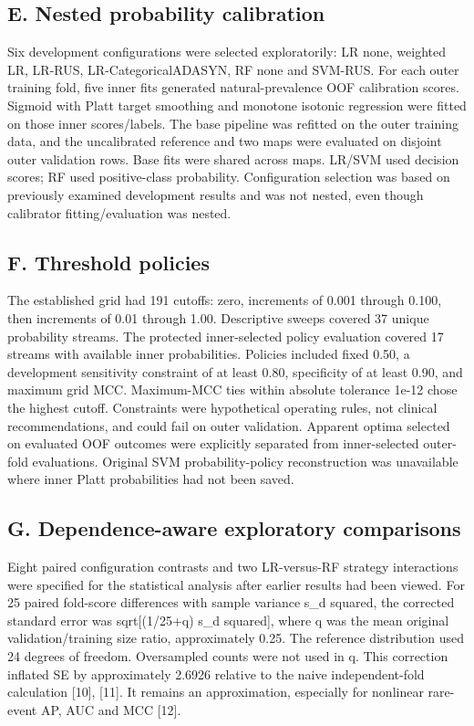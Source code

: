 \documentclass[10pt,twocolumn,letterpaper]{article}
\begin{document}
\subsection*{E. Nested probability calibration}
Six development configurations were selected exploratorily: LR none, weighted LR, LR-RUS, LR-CategoricalADASYN, RF none and SVM-RUS. For each outer training fold, five inner fits generated natural-prevalence OOF calibration scores. Sigmoid with Platt target smoothing and monotone isotonic regression were fitted on those inner scores/labels. The base pipeline was refitted on the outer training data, and the uncalibrated reference and two maps were evaluated on disjoint outer validation rows. Base fits were shared across maps. LR/SVM used decision scores; RF used positive-class probability. Configuration selection was based on previously examined development results and was not nested, even though calibrator fitting/evaluation was nested.


\subsection*{F. Threshold policies}
The established grid had 191 cutoffs: zero, increments of 0.001 through 0.100, then increments of 0.01 through 1.00. Descriptive sweeps covered 37 unique probability streams. The protected inner-selected policy evaluation covered 17 streams with available inner probabilities. Policies included fixed 0.50, a development sensitivity constraint of at least 0.80, specificity of at least 0.90, and maximum grid MCC. Maximum-MCC ties within absolute tolerance 1e-12 chose the highest cutoff. Constraints were hypothetical operating rules, not clinical recommendations, and could fail on outer validation. Apparent optima selected on evaluated OOF outcomes were explicitly separated from inner-selected outer-fold evaluations. Original SVM probability-policy reconstruction was unavailable where inner Platt probabilities had not been saved.


\subsection*{G. Dependence-aware exploratory comparisons}
Eight paired configuration contrasts and two LR-versus-RF strategy interactions were specified for the statistical analysis after earlier results had been viewed. For 25 paired fold-score differences with sample variance s\_d squared, the corrected standard error was sqrt[(1/25+q) s\_d squared], where q was the mean original validation/training size ratio, approximately 0.25. The reference distribution used 24 degrees of freedom. Oversampled counts were not used in q. This correction inflated SE by approximately 2.6926 relative to the naive independent-fold calculation [10], [11]. It remains an approximation, especially for nonlinear rare-event AP, AUC and MCC [12].
\end{document}
